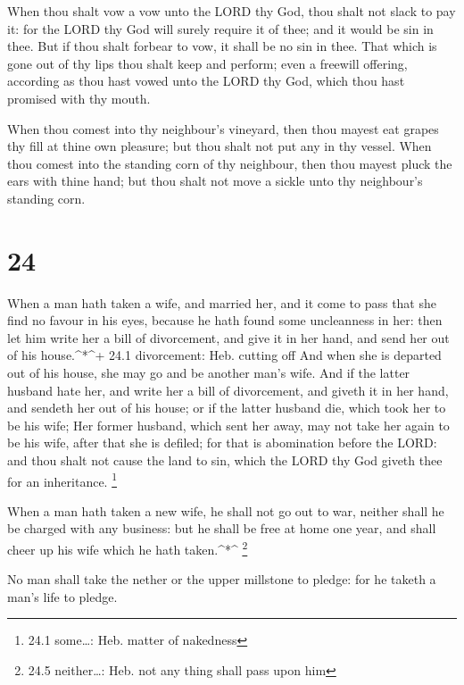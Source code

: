  When thou shalt vow a vow unto the LORD thy God, thou
shalt not slack to pay it: for the LORD thy God will surely require it
of thee; and it would be sin in thee.  But if thou shalt
forbear to vow, it shall be no sin in thee.  That which is
gone out of thy lips thou shalt keep and perform; even a freewill
offering, according as thou hast vowed unto the LORD thy God, which thou
hast promised with thy mouth.

 When thou comest into thy neighbour's vineyard, then thou
mayest eat grapes thy fill at thine own pleasure; but thou shalt not put
any in thy vessel.  When thou comest into the standing corn
of thy neighbour, then thou mayest pluck the ears with thine hand; but
thou shalt not move a sickle unto thy neighbour's standing corn.

\hypertarget{section-23}{%
\section{24}\label{section-23}}

 When a man hath taken a wife, and married her, and it come
to pass that she find no favour in his eyes, because he hath found some
uncleanness in her: then let him write her a bill of divorcement, and
give it in her hand, and send her out of his house.\^{}*\^{}+ 24.1
divorcement: Heb. cutting off  And when she is departed out
of his house, she may go and be another man's wife.  And if
the latter husband hate her, and write her a bill of divorcement, and
giveth it in her hand, and sendeth her out of his house; or if the
latter husband die, which took her to be his wife;  Her
former husband, which sent her away, may not take her again to be his
wife, after that she is defiled; for that is abomination before the
LORD: and thou shalt not cause the land to sin, which the LORD thy God
giveth thee for an inheritance. \footnote{24.1 some\ldots: Heb. matter
  of nakedness}

 When a man hath taken a new wife, he shall not go out to
war, neither shall he be charged with any business: but he shall be free
at home one year, and shall cheer up his wife which he hath
taken.\^{}*\^{} \footnote{24.5 neither\ldots: Heb. not any thing shall
  pass upon him}

 No man shall take the nether or the upper millstone to
pledge: for he taketh a man's life to pledge.

